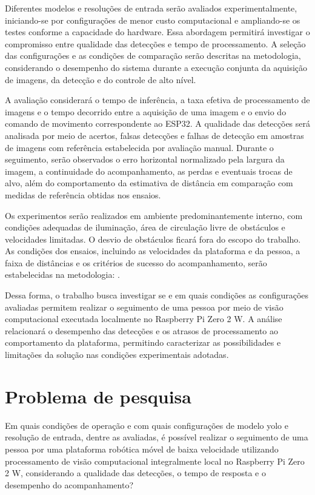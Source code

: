 Diferentes modelos e resoluções de entrada serão avaliados experimentalmente, iniciando-se por configurações de menor custo computacional e ampliando-se os testes conforme a capacidade do hardware. Essa abordagem permitirá investigar o compromisso entre qualidade das detecções e tempo de processamento. A seleção das configurações e as condições de comparação serão descritas na metodologia, considerando o desempenho do sistema durante a execução conjunta da aquisição de imagens, da detecção e do controle de alto nível.

A avaliação considerará o tempo de inferência, a taxa efetiva de processamento de imagens e o tempo decorrido entre a aquisição de uma imagem e o envio do comando de movimento correspondente ao ESP32. A qualidade das detecções será analisada por meio de acertos, falsas detecções e falhas de detecção em amostras de imagens com referência estabelecida por avaliação manual. Durante o seguimento, serão observados o erro horizontal normalizado pela largura da imagem, a continuidade do acompanhamento, as perdas e eventuais trocas de alvo, além do comportamento da estimativa de distância em comparação com medidas de referência obtidas nos ensaios.

Os experimentos serão realizados em ambiente predominantemente interno, com condições adequadas de iluminação, área de circulação livre de obstáculos e velocidades limitadas. O desvio de obstáculos ficará fora do escopo do trabalho. As condições dos ensaios, incluindo as velocidades da plataforma e da pessoa, a faixa de distâncias e os critérios de sucesso do acompanhamento, serão estabelecidas na metodologia: .

Dessa forma, o trabalho busca investigar se e em quais condições as configurações avaliadas permitem realizar o seguimento de uma pessoa por meio de visão computacional executada localmente no Raspberry Pi Zero 2 W. A análise relacionará o desempenho das detecções e os atrasos de processamento ao comportamento da plataforma, permitindo caracterizar as possibilidades e limitações da solução nas condições experimentais adotadas.

\section{Problema de pesquisa}

Em quais condições de operação e com quais configurações de modelo \gls{yolo} e resolução de entrada, dentre as avaliadas, é possível realizar o seguimento de uma pessoa por uma plataforma robótica móvel de baixa velocidade utilizando processamento de visão computacional integralmente local no Raspberry Pi Zero 2 W, considerando a qualidade das detecções, o tempo de resposta e o desempenho do acompanhamento?

